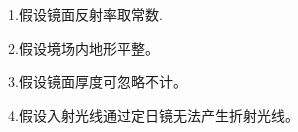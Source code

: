 \documentclass[../main.tex]{subfiles}
\begin{document}
 \par 1.假设镜面反射率取常数.
\par  2.假设境场内地形平整。
\par  3.假设镜面厚度可忽略不计。
\par  4.假设入射光线通过定日镜无法产生折射光线。 
\end{document}
